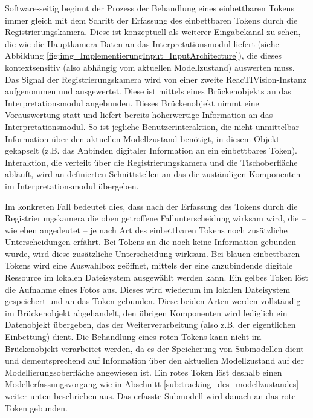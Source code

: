 Software-seitig beginnt der Prozess der Behandlung eines einbettbaren Tokens immer gleich mit dem Schritt der Erfassung des einbettbaren Tokens durch die Registrierungskamera. Diese ist konzeptuell als weiterer Eingabekanal zu sehen, die wie die Hauptkamera Daten an das Interpretationsmodul liefert (siehe Abbildung \ref{fig:img_ImplementierungInput_InputArchitecture}), die dieses kontextsensitiv (also abhängig vom aktuellen Modellzustand) auswerten muss. Das Signal der Registrierungskamera wird von einer zweite ReacTIVision-Instanz aufgenommen und ausgewertet. Diese ist mittels eines Brückenobjekts an das Interpretationsmodul angebunden. Dieses Brückenobjekt nimmt eine Vorauswertung statt und liefert bereits höherwertige Information an das Interpretationsmodul. So ist jegliche Benutzerinteraktion, die nicht unmittelbar Information über den aktuellen Modellzustand benötigt, in diesem Objekt gekapselt (z.B. das Anbinden digitaler Information an ein einbettbares Token). Interaktion, die verteilt über die Registrierungskamera und die Tischoberfläche abläuft, wird an definierten Schnittstellen an das die zuständigen Komponenten im Interpretationsmodul übergeben.

Im konkreten Fall bedeutet dies, dass nach der Erfassung des Tokens durch die Registrierungskamera die oben getroffene Fallunterscheidung wirksam wird, die -- wie eben angedeutet -- je nach Art des einbettbaren Tokens noch zusätzliche Unterscheidungen erfährt. Bei Tokens an die noch keine Information gebunden wurde, wird diese zusätzliche Unterscheidung wirksam. Bei blauen einbettbaren Tokens wird eine Auswahlbox geöffnet, mittels der eine anzubindende digitale Ressource im lokalen Dateisystem ausgewählt werden kann. Ein gelbes Token löst die Aufnahme eines Fotos aus. Dieses wird wiederum im lokalen Dateisystem gespeichert und an das Token gebunden. Diese beiden Arten werden vollständig im Brückenobjekt abgehandelt, den übrigen Komponenten wird lediglich ein Datenobjekt übergeben, das der Weiterverarbeitung (also z.B. der eigentlichen Einbettung) dient. Die Behandlung eines roten Tokens kann nicht im Brückenobjekt verarbeitet werden, da es der Speicherung von Submodellen dient und dementsprechend auf Information über den aktuellen Modellzustand auf der Modellierungsoberfläche angewiesen ist. Ein rotes Token löst deshalb einen Modellerfassungsvorgang wie in Abschnitt \ref{sub:tracking_des_modellzustandes} weiter unten beschrieben aus. Das erfasste Submodell wird danach an das rote Token gebunden.

